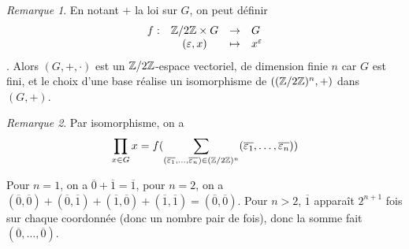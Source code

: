 \documentclass[12pt]{article}
\theoremstyle{remark}
\newtheorem{remark}{Remarque}[section]
\newcommand{\function}[5]{
	$$
	\begin{array}{rccl}
		#1: & #2 & \to & #3 \\
		& #4 & \mapsto & #5
	\end{array}
	$$
}
\numberwithin{equation}{section}
\begin{document}
\begin{remark}
	En notant $+$ la loi sur $G$, on peut définir \function{f}{\Z/2\Z\times G}{G}{(\varepsilon,x)}{x^{\varepsilon}}. Alors $(G,+,\cdot)$ est un $\mathbb{Z}/2\mathbb{Z}$-espace vectoriel, de dimension finie $n$ car $G$ est fini, et le choix d'une base réalise un isomorphisme de $((\mathbb{Z}/2\mathbb{Z})^{n},+)$ dans $(G,+)$.
\end{remark}

\begin{remark}
	Par isomorphisme, on a 
	$$\prod_{x\in G}x=f(\sum_{(\overline{\varepsilon_{1}},\dots,\overline{\varepsilon_{n}})\in(\mathbb{Z}/2\mathbb{Z})^{n}}(\overline{\varepsilon_{1}},\dots,\overline{\varepsilon_{n}}))$$

	Pour $n=1$, on a $\overline{0}+\overline{1}=\overline{1}$, pour $n=2$, on a $(\overline{0},\overline{0})+(\overline{0},\overline{1})+(\overline{1},\overline{0})+(\overline{1},\overline{1})=(\overline{0},\overline{0})$. Pour $n>2$, $\overline{1}$ apparaît $2^{n+1}$ fois sur chaque coordonnée (donc un nombre pair de fois), donc la somme fait $(\overline{0},\dots,\overline{0})$.
\end{remark}
\end{document}

